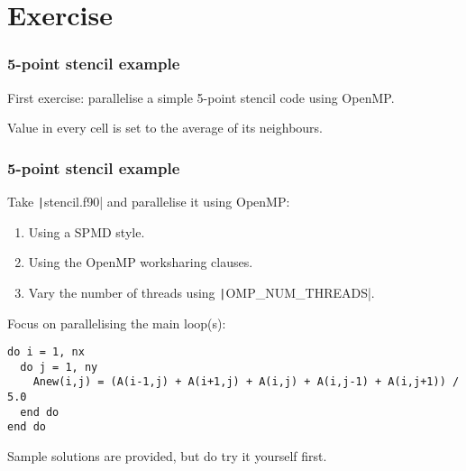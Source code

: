 \documentclass{beamer}
\begin{document}
\section{Exercise}
\begin{frame}
\frametitle{5-point stencil example}
First exercise: parallelise a simple 5-point stencil code using OpenMP.

\begin{center}
\end{center}

Value in every cell is set to the average of its neighbours.
\end{frame}

\begin{frame}[fragile]
\frametitle{5-point stencil example}
Take \texttt|stencil.f90| and parallelise it using OpenMP:
\begin{enumerate}
  \item Using a SPMD style.
  \item Using the OpenMP worksharing clauses.
  \item Vary the number of threads using \texttt|OMP_NUM_THREADS|.
\end{enumerate}

Focus on parallelising the main loop(s):
\begin{verbatim}
do i = 1, nx
  do j = 1, ny
    Anew(i,j) = (A(i-1,j) + A(i+1,j) + A(i,j) + A(i,j-1) + A(i,j+1)) / 5.0
  end do
end do
\end{verbatim}

Sample solutions are provided, but do try it yourself first.

\end{frame}
\end{document}
